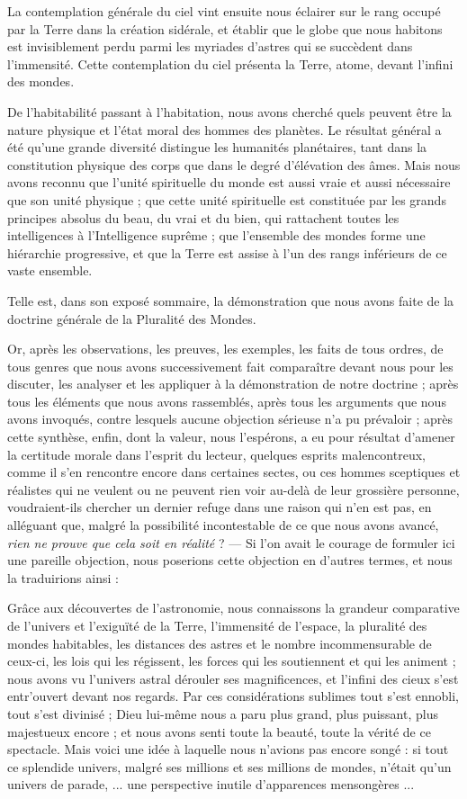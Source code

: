 \documentclass[a4paper, 11pt, oneside, landscape]{article}
\begin{document}
La contemplation générale du ciel vint ensuite nous éclairer sur le rang occupé par la Terre dans la création sidérale, et établir que le globe que nous habitons est invisiblement perdu parmi les myriades d'astres qui se succèdent dans l'immensité. Cette contemplation du ciel présenta la Terre, atome, devant l'infini des mondes.

De l'habitabilité passant à l'habitation, nous avons cherché quels peuvent être la nature physique et l'état moral des hommes des planètes. Le résultat général a été qu'une grande diversité distingue les humanités planétaires, tant dans la constitution physique des corps que dans le degré d'élévation des âmes. Mais nous avons reconnu que l'unité spirituelle du monde est aussi vraie et aussi nécessaire que son unité physique ; que cette unité spirituelle est constituée par les grands principes absolus du beau, du vrai et du bien, qui rattachent toutes les intelligences à l'Intelligence suprême ; que l'ensemble des mondes forme une hiérarchie progressive, et que la Terre est assise à l'un des rangs inférieurs de ce vaste ensemble.

Telle est, dans son exposé sommaire, la démonstration que nous avons faite de la doctrine générale de la Pluralité des Mondes.

Or, après les observations, les preuves, les exemples, les faits de tous ordres, de tous genres que nous avons successivement fait comparaître devant nous pour les discuter, les analyser et les appliquer à la démonstration de notre doctrine ; après tous les éléments que nous avons rassemblés, après tous les arguments que nous avons invoqués, contre lesquels aucune objection sérieuse n'a pu prévaloir ; après cette synthèse, enfin, dont la valeur, nous l'espérons, a eu pour résultat d'amener la certitude morale dans l'esprit du lecteur, quelques esprits malencontreux, comme il s'en rencontre encore dans certaines sectes, ou ces hommes sceptiques et réalistes qui ne veulent ou ne peuvent rien voir au-delà de leur grossière personne, voudraient-ils chercher un dernier refuge dans une raison qui n'en est pas, en alléguant que, malgré la possibilité incontestable de ce que nous avons avancé, \emph{rien ne prouve que cela soit en réalité} ? --- Si l'on avait le courage de formuler ici une pareille objection, nous poserions cette objection en d'autres termes, et nous la traduirions ainsi :

Grâce aux découvertes de l'astronomie, nous connaissons la grandeur comparative de l'univers et l'exiguïté de la Terre, l'immensité de l'espace, la pluralité des mondes habitables, les distances des astres et le nombre incommensurable de ceux-ci, les lois qui les régissent, les forces qui les soutiennent et qui les animent ; nous avons vu l'univers astral dérouler ses magnificences, et l'infini des cieux s'est entr'ouvert devant nos regards. Par ces considérations sublimes tout s'est ennobli, tout s'est divinisé ; Dieu lui-même nous a paru plus grand, plus puissant, plus majestueux encore ; et nous avons senti toute la beauté, toute la vérité de ce spectacle. Mais voici une idée à laquelle nous n'avions pas encore songé : si tout ce splendide univers, malgré ses millions et ses millions de mondes, n'était qu'un univers de parade, ... une perspective inutile d'apparences mensongères ...
\end{document}

